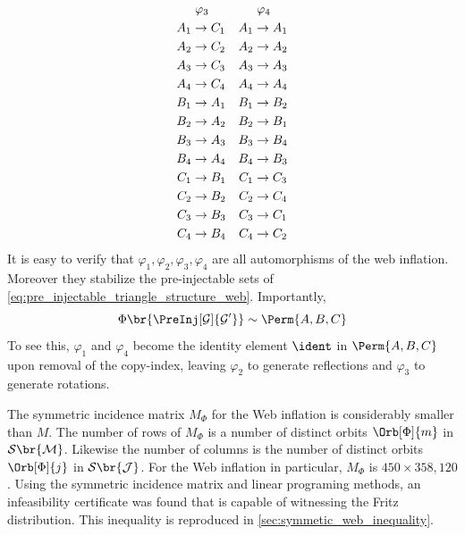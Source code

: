 \documentclass[aps, 10pt, english, twoside, pra, nofootinbib, tightenlines, longbibliography, superscriptaddress]{revtex4-1}
\renewcommand{\Events}[1]{\mathcal{S}\br{#1}} %
\begin{document}
\begin{equation*}
\begin{aligned}[c]
    &\hspace{1mm}\varphi_3 \\
    A_1 &\to C_1 \\A_2 &\to C_2 \\A_3 &\to C_3 \\A_4 &\to C_4 \\B_1 &\to A_1 \\B_2 &\to A_2 \\B_3 &\to A_3 \\B_4 &\to A_4 \\C_1 &\to B_1 \\C_2 &\to B_2 \\C_3 &\to B_3 \\C_4 &\to B_4
    \end{aligned}
    \quad
    \begin{aligned}[c]
    &\hspace{1mm}\varphi_4 \\
    A_1 &\to A_1 \\A_2 &\to A_2 \\A_3 &\to A_3 \\A_4 &\to A_4 \\B_1 &\to B_2 \\B_2 &\to B_1 \\B_3 &\to B_4 \\B_4 &\to B_3 \\C_1 &\to C_3 \\C_2 &\to C_4 \\C_3 &\to C_1 \\C_4 &\to C_2
    \end{aligned}
    \end{equation*}
    It is easy to verify that $\varphi_1, \varphi_2, \varphi_3, \varphi_4$ are all automorphisms of the web inflation. Moreover they stabilize the pre-injectable sets of \cref{eq:pre_injectable_triangle_structure_web}. Importantly,
    \[ \gp\br{\PreInj[\graph]{\graph'}} \sim \Perm{A,B,C} \]
    To see this, $\varphi_1$ and $\varphi_4$ become the identity element $\ident$ in $\Perm{A,B,C}$ upon removal of the copy-index, leaving $\varphi_2$ to generate reflections and $\varphi_3$ to generate rotations.

    The symmetric incidence matrix $M_{\Phi}$ for the Web inflation is considerably smaller than $M$. The number of rows of $M_{\Phi}$ is a number of distinct orbits $\Orb[\Phi]{m}$ in $\Events{\mscenario}$. Likewise the number of columns is the number of distinct orbits $\Orb[\Phi]{j}$ in $\Events{\jointvar}$. For the Web inflation in particular, $M_{\Phi}$ is $450 \times 358,120$. Using the symmetric incidence matrix and linear programing methods, an infeasibility certificate was found that is capable of witnessing the Fritz distribution. This inequality is reproduced in \cref{sec:symmetic_web_inequality}.
\end{document}
